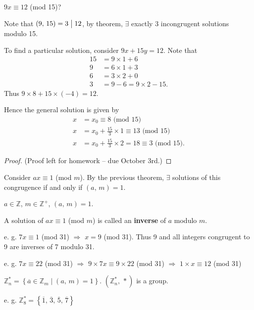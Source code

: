 \begin{example}
    $9x \equiv 12$ (mod 15)?

    Note that $\left(9,\,15\right)=3\bigm| 12$, by theorem,
    $\exists$ exactly 3 incongrugent solutions modulo 15.

    To find a particular solution, consider $9x+15y=12$.
    Note that
    \begin{align*}
        15&=9 \times 1 + 6 \\
        9&=6 \times 1 + 3 \\
        6&=3 \times 2 + 0 \\
        3&=9-6=9\times 2 - 15.
    \end{align*}
    Thus $9 \times 8 + 15 \times \left(-4\right) = 12$.

    Hence the general solution is given by
    \begin{align*}
        x&=x_0\equiv8 \mbox{ (mod 15)} \\ 
        x&=x_0+\frac{15}{3}\times 1\equiv13 \mbox{ (mod 15)} \\ 
        x&=x_0+\frac{15}{3}\times 2=18\equiv 3 \mbox{ (mod 15)}.
    \end{align*}
\end{example}

\begin{proof}
    (Proof left for homework -- due October 3rd.)
\end{proof}

\begin{remark}
    Consider $ax \equiv 1$ (mod $m$).
    By the previous theorem, $\exists$ solutions of this congrugence
    if and only if $\left(a,\,m\right) = 1$.
\end{remark}

\begin{definition}
    $a \in \mathbb{Z}$, $m \in \mathbb{Z}^+$, $\left(a,\,m\right)=1$.

    A solution of $ax \equiv 1$ (mod $m$) is called an \textbf{inverse} of
    $a$ modulo $m$.
\end{definition}

e. g. $7x\equiv 1$ (mod 31) $\Rightarrow$ $x=9$ (mod 31).
Thus 9 and all integers congrugent to 9 are inverses of 7 modulo 31.

e. g. $7x \equiv 22$ (mod 31) $\Rightarrow$ $9\times 7x \equiv 9\times 22$ (mod 31)
$\Rightarrow$ $1\times x \equiv 12$ (mod 31)

\begin{remark}
    $\mathbb{Z}_n^*=\left\{\overline{a}\in \mathbb{Z}_m \mid \left(a,\,m\right)=1\right\}$.
    $\left(\mathbb{Z}_n^*,\,*\right)$ is a group.
\end{remark}

e. g. $\mathbb{Z}_{8}^*=\left\{\overline{1},\,\overline{3},\,\overline{5},\,\overline{7}\right\}$